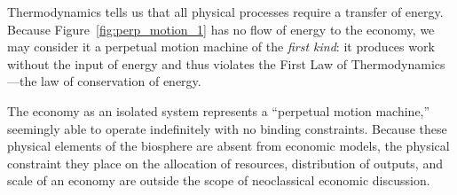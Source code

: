 Thermodynamics tells us that all physical processes require
a transfer of energy.
Because Figure~\ref{fig:perp_motion_1} has no flow of energy
to the economy,
we may consider it a perpetual motion machine
of the \emph{first kind}:
it produces work without the input of energy and
thus violates the First Law of Thermodynamics---the 
law of conservation of energy.\cite{Rao2004}

The economy as an isolated system
represents a ``perpetual motion machine,'' %
seemingly able to operate indefinitely with 
no binding constraints.
Because these physical elements of the biosphere are absent from economic models,
the physical constraint they place on the allocation of resources, distribution of outputs, and 
scale of an economy are outside the scope of neoclassical economic discussion.~\cite{Daly1995}

%
%

